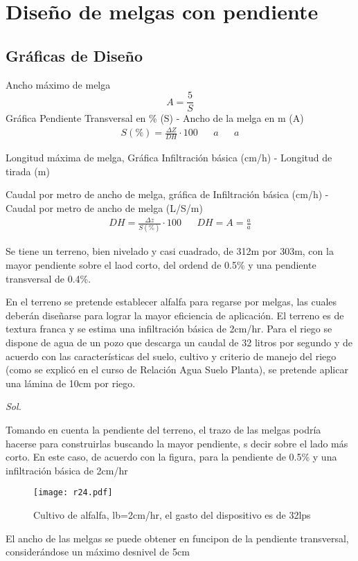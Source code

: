 \section{Diseño de melgas con pendiente}
\subsection{Gráficas de Diseño}
Ancho máximo de melga
\begin{equation}
    A = \frac{5}{S}
\end{equation}
Gráfica Pendiente Transversal en \% (S) - Ancho de la melga en m (A)
\begin{align*}
    S(\%) = \frac{\Delta Z}{DH} \cdot 100 &&a &&a
\end{align*}

Longitud máxima de melga, Gráfica Infiltración básica (cm/h) - Longitud de tirada (m)


Caudal por metro de ancho de melga, gráfica de Infiltración básica (cm/h) - Caudal por metro de ancho de melga (L/S/m)
\begin{align*}
    DH= \frac{\Delta z}{S(\%)}\cdot 100&& DH= A=\frac{a}{a}
\end{align*}

\begin{example}
    Se tiene un terreno, bien nivelado y casi cuadrado, de 312m por 303m, con la mayor pendiente sobre el laod corto, del ordend de 0.5\% y una pendiente transversal de 0.4\%.

    En el terreno se pretende establecer alfalfa para regarse por melgas, las cuales deberán diseñarse para lograr la mayor eficiencia de aplicación. El terreno es de textura franca y se estima una infiltración básica de 2cm/hr. Para el riego se dispone de agua de un pozo que descarga un caudal de 32 litros por segundo y de acuerdo con las características del suelo, cultivo y criterio de manejo del riego (como se explicó en el curso de Relación Agua Suelo Planta), se pretende aplicar una lámina de 10cm por riego.
\end{example}

\textit{Sol. }

Tomando en cuenta la pendiente del terreno, el trazo de las melgas podría hacerse para construirlas buscando la mayor pendiente, s decir sobre el lado más corto. En este caso, de acuerdo con la figura, para la pendiente de 0.5\% y una infiltración básica de 2cm/hr 
\begin{figure}[h!]
    \centering
    \texttt{[image: r24.pdf]}
    \caption{Cultivo de alfalfa, lb=2cm/hr, el gasto del dispositivo es de 32lps}
    \label{r24}
\end{figure}
El ancho de las melgas se puede obtener en funcipon de la pendiente transversal, considerándose un máximo desnivel de 5cm

